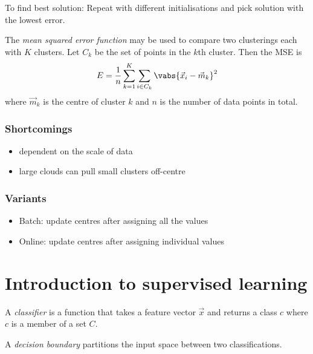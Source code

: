 \documentclass{article}
\begin{document}
To find best solution: Repeat with different initialisations and pick solution
with the lowest error.
\begin{definition}
	The \emph{mean squared error function} may be used to compare two clusterings
	each with $K$ clusters. Let $C_k$ be the set of points in the $k$th cluster.
	Then the MSE is
	\begin{align*}
		E = \frac{1}{n}\sum_{k=1}^K \sum_{i\in C_k} \vabs{\vec x_i - \vec m_k}^2
	\end{align*}
	where $\vec m_k$ is the centre of cluster $k$ and $n$ is the number of data
	points in total.
\end{definition}

\subsubsection{Shortcomings}

\begin{itemize}
	\item dependent on the scale of data
	\item large clouds can pull small clusters off-centre
\end{itemize}

\subsubsection{Variants}

\begin{itemize}
	\item Batch: update centres after assigning all the values
	\item Online: update centres after assigning individual values 
\end{itemize}



\section{Introduction to supervised learning}



\begin{definition}
	A \emph{classifier} is a function that takes a feature vector $\vec x$
	and returns a class $c$ where $c$ is a member of a set $C$.
\end{definition}
\begin{definition}
	A \emph{decision boundary} partitions the input space between two
	classifications.
\end{definition}
\end{document}
